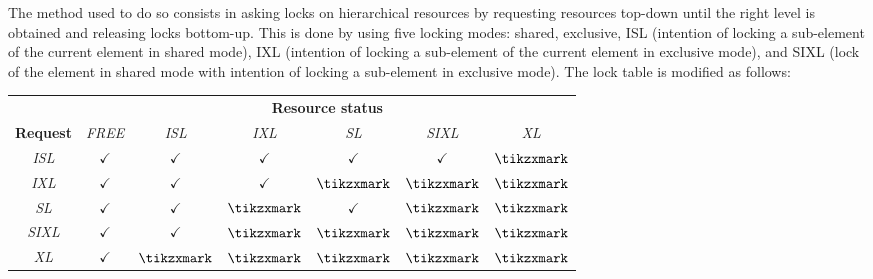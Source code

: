 \begin{itemize}
        The method used to do so consists in asking locks on hierarchical resources by requesting resources top-down until the right level is obtained and releasing locks bottom-up. 
        This is done by using five locking modes: shared, exclusive, ISL (intention of locking a sub-element of the current element in shared mode), IXL (intention of locking a sub-element of the current element in exclusive mode), and SIXL (lock of the element in shared mode with intention of locking a sub-element in exclusive mode). 
        The lock table is modified as follows:
    \begin{table}[H]
        \centering
        \begin{tabular}{ccccccc}
        \textbf{}                             & \multicolumn{6}{c}{\textbf{Resource status}}                                                                                                                                                                            \\ \cline{2-7} 
        \multicolumn{1}{c|}{\textbf{Request}} & \multicolumn{1}{c}{\textit{FREE}} & \multicolumn{1}{c}{\textit{ISL}} & \multicolumn{1}{c}{\textit{IXL}} & \multicolumn{1}{c}{\textit{SL}}  & \multicolumn{1}{c}{\textit{SIXL}} & \multicolumn{1}{c|}{\textit{XL}}  \\ \hline
        \multicolumn{1}{|c|}{\textit{ISL}}    & \multicolumn{1}{c}{$\checkmark$}  & \multicolumn{1}{c}{$\checkmark$} & \multicolumn{1}{c}{$\checkmark$} & \multicolumn{1}{c}{$\checkmark$} & \multicolumn{1}{c}{$\checkmark$}  & \multicolumn{1}{c|}{$\tikzxmark$} \\ 
        \multicolumn{1}{|c|}{\textit{IXL}}    & \multicolumn{1}{c}{$\checkmark$}  & \multicolumn{1}{c}{$\checkmark$} & \multicolumn{1}{c}{$\checkmark$} & \multicolumn{1}{c}{$\tikzxmark$} & \multicolumn{1}{c}{$\tikzxmark$}  & \multicolumn{1}{c|}{$\tikzxmark$} \\ 
        \multicolumn{1}{|c|}{\textit{SL}}     & \multicolumn{1}{c}{$\checkmark$}  & \multicolumn{1}{c}{$\checkmark$} & \multicolumn{1}{c}{$\tikzxmark$} & \multicolumn{1}{c}{$\checkmark$} & \multicolumn{1}{c}{$\tikzxmark$}  & \multicolumn{1}{c|}{$\tikzxmark$} \\
        \multicolumn{1}{|c|}{\textit{SIXL}}   & \multicolumn{1}{c}{$\checkmark$}  & \multicolumn{1}{c}{$\checkmark$} & \multicolumn{1}{c}{$\tikzxmark$} & \multicolumn{1}{c}{$\tikzxmark$} & \multicolumn{1}{c}{$\tikzxmark$}  & \multicolumn{1}{c|}{$\tikzxmark$} \\ 
        \multicolumn{1}{|c|}{\textit{XL}}     & \multicolumn{1}{c}{$\checkmark$}  & \multicolumn{1}{c}{$\tikzxmark$} & \multicolumn{1}{c}{$\tikzxmark$} & \multicolumn{1}{c}{$\tikzxmark$} & \multicolumn{1}{c}{$\tikzxmark$}  & \multicolumn{1}{c|}{$\tikzxmark$} \\ \hline

\end{tabular}
\end{table}
\end{itemize}
